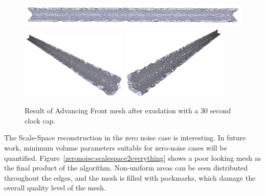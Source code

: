 \documentclass[12pt]{drexelthesis}
\begin{document}
\begin{figure}[!ht]
	\centering
		\includegraphics[width=5in]{simulated-lab-scan/0noise/optimizedNeat/advancingfronteverything00.png}
		\includegraphics[width=2in]{simulated-lab-scan/0noise/optimizedNeat/advancingfronteverything01.png}
		\includegraphics[width=2in]{simulated-lab-scan/0noise/optimizedNeat/advancingfronteverything02.png}
		\caption[Advancing Front mesh after exudation with a 30 second clock cap]{\centering  Result of Advancing Front mesh after exudation with a 30 second clock cap.}
	\label{zeronoise:advancedeverything}
\end{figure}

The Scale-Space reconstruction in the zero noise case is interesting. In future work, minimum volume parameters suitable for zero-noise cases will be quantified. Figure~\ref{zeronoise:scalespace2everything} shows a poor looking mesh as the final product of the algorithm. Non-uniform areas can be seen distributed throughout the edges, and the mesh is filled with pockmarks, which damage the overall quality level of the mesh. 
\end{document}
